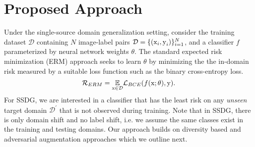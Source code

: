 \section{Proposed Approach} 
Under the single-source domain generalization setting, consider the training dataset $\mathcal{D}$ containing $N$ image-label pairs $\mathcal{D} = \{(\operatorname{\mathrm{x}}_i, \operatorname{\mathrm{y}}_i)\}_{i=1}^{N}$, and a classifier $f$ parameterized by neural network weights $\theta$. 
The standard expected risk minimization (ERM) approach seeks to learn $\theta$ by minimizing the the in-domain risk measured by a suitable loss function such as the binary cross-entropy loss.
\begin{equation}
    \mathcal{R}_{ERM} = \underset{\operatorname{\mathrm{x}}\in\mathcal{D}}{\operatorname*{\mathbb{E}}} \mathcal{L}_{BCE}(f(\operatorname{\mathrm{x}};\theta), \operatorname{\mathrm{y}}).
    \label{alt:eq:erm}
\end{equation}
For SSDG, we are interested in a classifier that has the least risk on any \textit{unseen} target domain $\mathcal{D}^\prime$ that is not observed during training. Note that in SSDG, there is only domain shift and no label shift, i.e. we assume the same classes exist in the training and testing domains. 
Our approach builds on diversity based and adversarial augmentation approaches which we outline next. 

